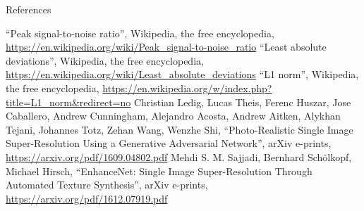 \documentclass{beamer}
\begin{document}
\begin{frame}[allowframebreaks]{References}
\begin{thebibliography}{30}
		 ``Peak signal-to-noise ratio'', Wikipedia, the free encyclopedia, \url{https://en.wikipedia.org/wiki/Peak_signal-to-noise_ratio}
		 ``Least absolute deviations'', Wikipedia, the free encyclopedia, \url{https://en.wikipedia.org/wiki/Least_absolute_deviations}
		 ``L1 norm'', Wikipedia, the free encyclopedia, \url{https://en.wikipedia.org/w/index.php?title=L1_norm&redirect=no}
		 Christian Ledig, Lucas Theis, Ferenc Huszar, Jose Caballero, Andrew Cunningham, Alejandro Acosta, Andrew Aitken, Alykhan Tejani, Johannes Totz, Zehan Wang, Wenzhe Shi, ``Photo-Realistic Single Image Super-Resolution Using a Generative Adversarial Network'', arXiv e-prints, \url{https://arxiv.org/pdf/1609.04802.pdf}
		 Mehdi S. M. Sajjadi, Bernhard Schölkopf, Michael Hirsch, ``EnhanceNet: Single Image Super-Resolution Through Automated Texture Synthesis'', arXiv e-prints, \url{https://arxiv.org/pdf/1612.07919.pdf}
		\end{thebibliography}
	
	\end{frame}
\end{document}
